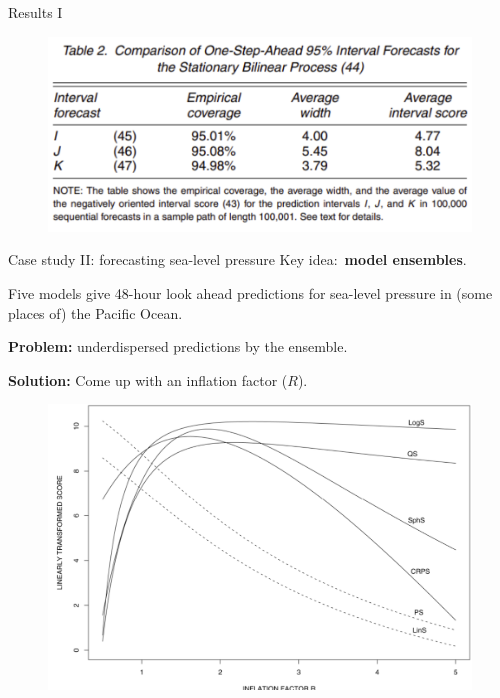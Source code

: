 \begin{frame}{Results I}
 \begin{figure}
 \begin{center}
  \includegraphics[scale=0.5]{figures/heterokedastic.pdf}
 \end{center}
\end{figure}
\end{frame}
\begin{frame}{Case study II: forecasting sea-level pressure}
 Key idea:~\textbf{model ensembles}.
 
 Five models give 48-hour look ahead predictions for sea-level pressure in (some places of) the Pacific Ocean. 
 
 \textbf{Problem:} underdispersed predictions by the ensemble.
 
 \textbf{Solution:} Come up with an inflation factor ($R$).
 
 \begin{figure}
 \begin{center}
  \includegraphics[scale=0.3]{figures/sealevelpressure.pdf}
 \end{center}
\end{figure}
 
\end{frame}
